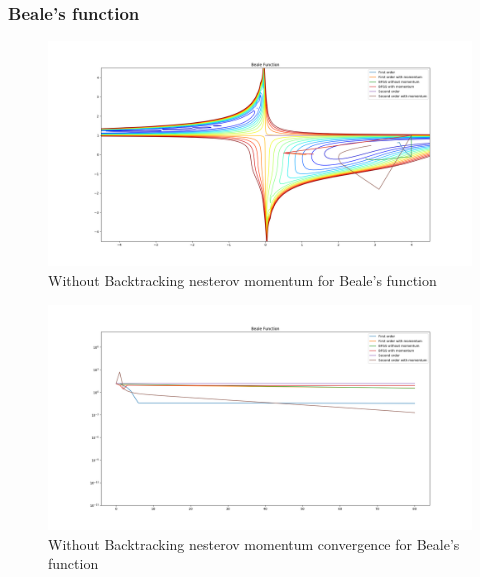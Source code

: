 \documentclass{article}
\begin{document}
\subsubsection{Beale's function}
\begin{center}
\begin{figure}[H]
	\includegraphics[width=\linewidth]{../Images/bealenesterov.png}
	\caption{Without Backtracking nesterov momentum for Beale's function}
	\label{fig:Without Backtracking nesterov momentum for Beale's function}
\end{figure}

\begin{figure}[H]
	\includegraphics[width=\linewidth]{../Images/bealenesterov1.png}
	\caption{Without Backtracking nesterov momentum convergence for Beale's function}
	\label{fig:Without Backtracking nesterov momentum convergence for Beale's function}
\end{figure}


\end{center}
\end{document}
